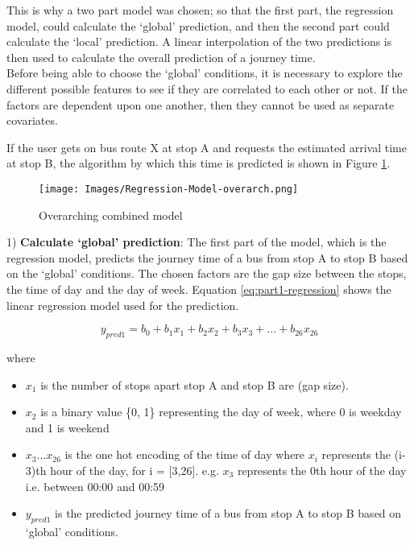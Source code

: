 This is why a two part model was chosen; so that the first part, the regression model, could calculate the `global' prediction, and then the second part could calculate the `local' prediction. A linear interpolation of the two predictions is then used to calculate the overall prediction of a journey time. \\

Before being able to choose the `global' conditions, it is necessary to explore the different possible features to see if they are correlated to each other or not. If the factors are dependent upon one another, then they cannot be used as separate covariates. 

If the user gets on bus route X at stop A and requests the estimated arrival time at stop B, the algorithm by which this time is predicted is shown in Figure \ref{fig:overarch-combined-model}. \\

\begin{figure}[H]
\begin{center}
    \texttt{[image: Images/Regression-Model-overarch.png]}
    \caption{Overarching combined model}
    \label{fig:overarch-combined-model}
\end{center}
\end{figure}

1) \textbf{Calculate `global' prediction}: The first part of the model, which is the regression model, predicts the journey time of a bus from stop A to stop B based on the `global' conditions. The chosen factors are the gap size between the stops, the time of day and the day of week. Equation \ref{eq:part1-regression} shows the linear regression model used for the prediction.

\begin{equation}
\label{eq:part1-regression}
    y_{pred1} = b_0 + b_1x_1 + b_2x_2 + b_3x_3 + ... + b_{26}x_{26}
\end{equation}

where 
\begin{itemize}
    \item $x_1$ is the number of stops apart stop A and stop B are (gap size).
    \item $x_2$ is a binary value \{0, 1\} representing the day of week, where 0 is weekday and 1 is weekend
    \item $x_3 ... x_{26}$ is the one hot encoding of the time of day where $x_i$ represents the (i-3)th hour of the day, for i = [3,26]. e.g. $x_3$ represents the 0th hour of the day i.e. between 00:00 and 00:59
    \item $y_{pred1}$ is the predicted journey time of a bus from stop A to stop B based on `global' conditions.
\end{itemize}


